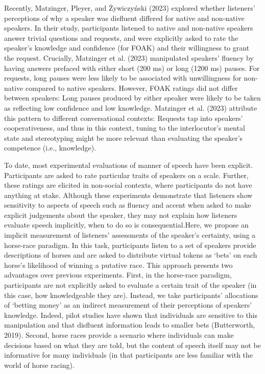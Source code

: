 \documentclass[
  man,floatsintext]{apa6}
\begin{document}
Recently, Matzinger, Pleyer, and Żywiczyński (2023) explored whether listeners' perceptions of why a speaker was disfluent differed for native and non-native speakers. In their study, participants listened to native and non-native speakers answer trivial questions and requests, and were explicitly asked to rate the speaker's knowledge and confidence (for FOAK) and their willingness to grant the request. Crucially, Matzinger et al. (2023) manipulated speakers' fluency by having answers prefaced with either short (200 ms) or long (1200 ms) pauses. For requests, long pauses were less likely to be associated with unwillingness for non-native compared to native speakers. However, FOAK ratings did not differ between speakers: Long pauses produced by either speaker were likely to be taken as reflecting low confidence and low knowledge. Matzinger et al. (2023) attribute this pattern to different conversational contexts: Requests tap into speakers' cooperativeness, and thus in this context, tuning to the interlocutor's mental state and stereotyping might be more relevant than evaluating the speaker's competence (i.e., knowledge).

To date, most experimental evaluations of manner of speech have been explicit. Participants are asked to rate particular traits of speakers on a scale. Further, these ratings are elicited in non-social contexts, where participants do not have anything at stake. Although these experiments demonstrate that listeners show sensitivity to aspects of speech such as fluency and accent when asked to make explicit judgements about the speaker, they may not explain how listeners evaluate speech implicitly, when to do so is consequential.Here, we propose an implicit measurement of listeners' assessments of the speaker's certainty, using a horse-race paradigm. In this task, participants listen to a set of speakers provide descriptions of horses and are asked to distribute virtual tokens as `bets' on each horse's likelihood of winning a putative race. This approach presents two advantages over previous experiments. First, in the horse-race paradigm, participants are not explicitly asked to evaluate a certain trait of the speaker (in this case, how knowledgeable they are). Instead, we take participants' allocations of `betting money' as an indirect measurement of their perceptions of speakers' knowledge. Indeed, pilot studies have shown that individuals are sensitive to this manipulation and that disfluent information leads to smaller bets (Butterworth, 2019). Second, horse races provide a scenario where individuals can make decisions based on what they are told, but the content of speech itself may not be informative for many individuals (in that participants are less familiar with the world of horse racing).
\end{document}
